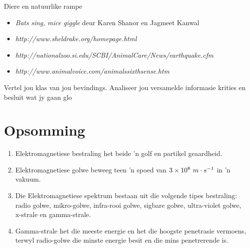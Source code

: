 \begin{project}{Diere en natuurlike rampe}
\begin{itemize}[noitemsep]
\item \textsl{Bats sing, mice giggle} deur Karen Shanor en Jagmeet Kanwal
\item \textsl{http://www.sheldrake.org/homepage.html}
\item \textsl{http://nationalzoo.si.edu/SCBI/AnimalCare/News/earthquake.cfm}
\item \textsl{http://www.animalvoice.com/animalssixthsense.htm}
\end{itemize}
        \label{m38779*id1164121076422} Vertel jou klas van jou bevindings. Analiseer jou versamelde informasie krities en besluit wat jy gaan glo\par 
      \label{m38779*cid9}
      \end{project}

\section{Opsomming}
            \nopagebreak
      \label{m38779*id189769}\begin{enumerate}[noitemsep, label=\textbf{\arabic*}. ] 
            \label{m38779*uid30}\item Elektromagnetiese bestraling het beide 'n golf en partikel geaardheid.
\label{m38779*uid31}\item Elektromagnetiese golwe beweeg teen 'n spoed van $3\ensuremath{\times}{10}^{8}\phantom{\rule{3.33333pt}{0ex}}m\ensuremath{\cdot}{s}^{-1}$ in 'n vakuum.
\label{m38779*uid32}\item Die Elektromagnetiese spektrum bestaan uit die volgende tipes bestraling: radio golwe, mikro-golwe, infra-rooi golwe, sigbare golwe, ultra-violet golwe, x-strale en gamma-strale. 
\label{m38779*uid33}\item Gamma-strale het die meeste energie en het die hoogste penetrasie vermoens, terwyl radio-golwe die minste energie besit en die mins penetrerende is. 
\end{enumerate}
